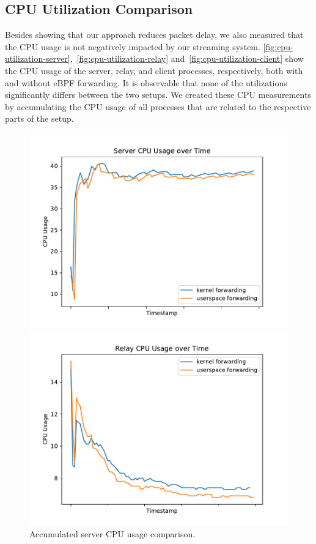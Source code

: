 \subsection{CPU Utilization Comparison}
Besides showing that our approach reduces packet delay, we also measured that the CPU usage is 
not negatively impacted by our streaming system.
\autoref{fig:cpu-utilization-server},~\ref{fig:cpu-utilization-relay} and~\ref{fig:cpu-utilization-client}
show the CPU usage of the server, relay, and client processes, respectively, both with and without eBPF forwarding.
It is observable that none of the utilizations significantly differs between the two setups.
We created these CPU measurements by accumulating the CPU usage of all processes that are related 
to the respective parts of the setup.

\begin{figure}[H]
    \begin{minipage}{0.48\textwidth}
        \centering
        \includegraphics[width=1\linewidth]{figures/04_testing_and_results/cpu_usage_server_ns.pdf}
        \caption[Server CPU usage comparison]{Accumulated server CPU usage comparison.}\label{fig:cpu-utilization-server}
    \end{minipage}\hfill
    \begin{minipage}{0.48\textwidth}
        \centering
        \includegraphics[width=1\linewidth]{figures/04_testing_and_results/cpu_usage_relay_ns.pdf}

\end{minipage}
\end{figure}
